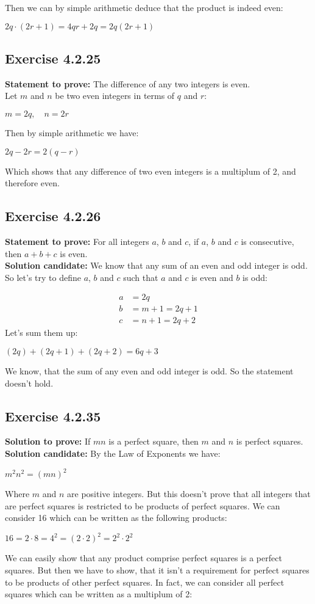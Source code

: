 \documentclass{report}
\newcommand{\cent}[1]{\begin{center}#1\end{center}}
\newcommand{\mAlign}[1]{\begin{align*}#1\end{align*}}
\newcommand{\Prove}{\textbf{Statement to prove: }}
\newcommand{\Solution}{\textbf{Solution candidate: }}
\newcommand{\QED}{\boxed{}}
\newcommand{\Exercise}[1]{\subsection{Exercise #1}}
\begin{document}
	Then we can by simple arithmetic deduce that the product is indeed even:
	
	\cent{$ 2q \cdot (2r+1) = 4qr+2q = 2q(2r+1) $}
	
	\QED
	
	\Exercise{4.2.25}
	
	\Prove
	The difference of any two integers is even.\\
	
	Let $m$ and $n$ be two even integers in terms of $q$ and $r$: 
	
	\cent{$m = 2q, \quad n = 2r$}
	
	Then by simple arithmetic we have:
	\cent{$2q - 2r = 2(q-r)$}
	
	Which shows that any difference of two even integers is a multiplum of 2, and therefore even.
	\QED
	
	\Exercise{4.2.26}
	\Prove
	For all integers $a$, $b$ and $c$, if $a$, $b$ and $c$ is consecutive, then $a+b+c$ is even.\\
	
	\Solution
	We know that any sum of an even and odd integer is odd. So let's try to define $a$, $b$ and $c$ such that $a$ and $c$ is even and $b$ is odd:
	
	\mAlign{a &= 2q\\
					b &= m + 1 = 2q+1 \\
					c &= n + 1 = 2q+2}
	Let's sum them up:
	
	\cent{$(2q) + (2q+1) + (2q+2) = 6q+3$}
	
	We know, that the sum of any even and odd integer is odd. So the statement doesn't hold.
	
	\QED
	
	\Exercise{4.2.35}
	\textbf{Solution to prove:}
	If $mn$ is a perfect square, then $m$ and $n$ is perfect squares.\\
	
	\Solution
	By the Law of Exponents we have:
	\cent{$ m^2 n^2=(mn)^2$}
	
	Where $m$ and $n$ are positive integers. But this doesn't prove that all integers that are perfect squares is restricted to be products of perfect squares. We can consider 16 which can be written as the following products:
	
	\cent{$16 = 2 \cdot 8 = 4^2 = (2 \cdot 2)^2 = 2^2 \cdot 2^2$}
	
	We can easily show that any product comprise perfect squares is a perfect squares. But then we have to show, that it isn't a requirement for perfect squares to be products of other perfect squares. In fact, we can consider all perfect squares which can be written as a multiplum of 2:
	
\end{document}

